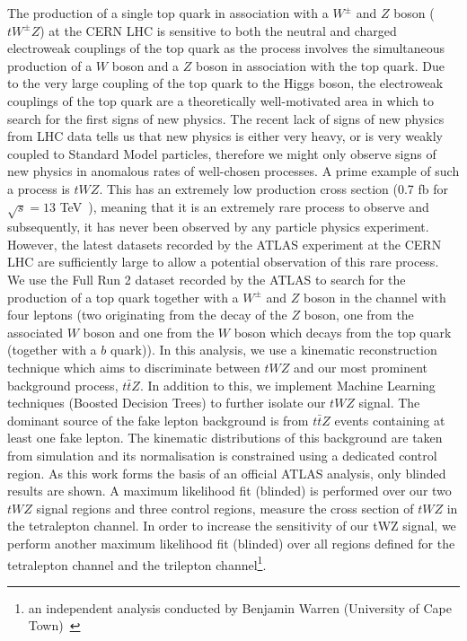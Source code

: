 The production of a single top quark in association with a $W^{\pm}$ and $Z$ boson ($tW^{\pm}Z$) at the CERN LHC is sensitive to both the neutral and charged electroweak couplings of the top quark as the process involves the simultaneous production of a $W$ boson and a $Z$ boson in association with the top quark. Due to the very large coupling of the top quark to the Higgs boson, the electroweak couplings of the top quark are a theoretically well-motivated area in which to search for the first signs of new physics. The recent lack of signs of new physics from LHC data tells us that new physics is either very heavy, or is very weakly coupled to Standard Model particles, therefore we might only observe signs of new physics in anomalous rates of well-chosen processes. A prime example of such a process is $tWZ$. This has an extremely low production cross section (0.7 fb for $\sqrt{s}=13$ TeV~\cite{twz-theory-paper}), meaning that it is an extremely rare process to observe and subsequently, it has never been observed by any particle physics experiment. However, the latest datasets recorded by the ATLAS experiment at the CERN LHC are sufficiently large to allow a potential observation of this rare process. We use the Full Run 2 dataset recorded by the ATLAS to search for the production of a top quark together with a $W^{\pm}$ and $Z$ boson in the channel with four leptons (two originating from the decay of the $Z$ boson, one from the associated $W$ boson and one from the $W$ boson which decays from the top quark (together with a $b$ quark)). In this analysis, we use a kinematic reconstruction technique which aims to discriminate between $tWZ$ and our most prominent background process, $t\bar{t}Z$. In addition to this, we implement Machine Learning techniques (Boosted Decision Trees) to further isolate our $tWZ$ signal. The dominant source of the fake lepton background is from $t\bar{t}Z$ events containing at least one fake lepton. The kinematic distributions of this background are taken from simulation and its normalisation is constrained using a dedicated control region. As this work forms the basis of an official ATLAS analysis, only blinded results are shown. A maximum likelihood fit (blinded) is performed over our two $tWZ$ signal regions and three control regions, measure the cross section of $tWZ$ in the tetralepton channel. In order to increase the sensitivity of our tWZ signal, we perform another maximum likelihood fit (blinded) over all regions defined for the tetralepton channel and the trilepton channel\footnote{an independent analysis conducted by Benjamin Warren (University of Cape Town)~\cite{ben-thesis}}.
